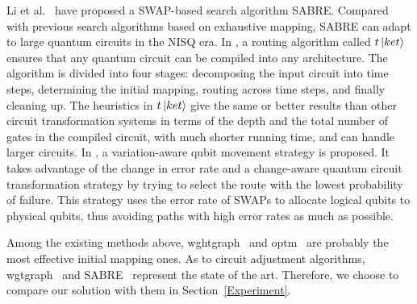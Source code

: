 \documentclass[journal]{IEEEtran}
\begin{document}
\begin{itemize}
Li et al.~\cite{Li2018} have proposed a SWAP-based search algorithm SABRE. Compared with previous search algorithms based on exhaustive mapping, SABRE
can adapt to large quantum circuits in the NISQ era. In \cite{Cowtan2019}, a routing algorithm called $t\left\vert{ket}\right\rangle$  ensures that any quantum circuit can be compiled into any architecture. The algorithm is divided into four stages: decomposing the input circuit into time steps, determining the initial mapping, routing across time steps, and finally cleaning up. The heuristics in $t\left\vert{ket}\right\rangle$ give the same or better results than other circuit transformation systems in terms of the depth and the total number of gates in the compiled circuit, with much shorter running time, and can handle larger circuits. In \cite{Tannu2019},  a variation-aware qubit movement strategy is proposed. It takes advantage of the change in error rate and a change-aware quantum circuit transformation strategy by trying to select the route with the lowest probability of failure. This strategy uses the error rate of  SWAPs to allocate logical qubits to physical qubits, thus avoiding paths with high error rates as much as possible.
\end{itemize}

Among the existing methods above, wghtgraph~\cite{2020Qubit} and optm~\cite{Zulehner2017} are probably the most effective initial mapping ones. As to circuit adjustment algorithms, wgtgraph~\cite{2020Qubit} and SABRE~\cite{Li2018} represent the state of the art. Therefore, we choose to compare our solution with them in Section~\ref{Experiment}.
\end{document}
